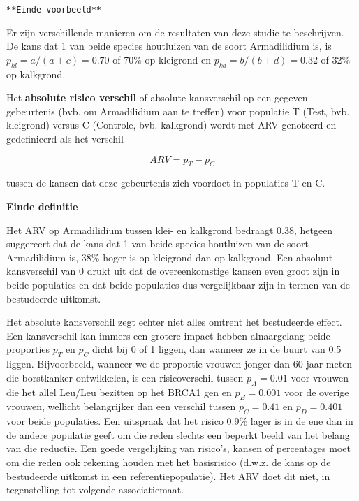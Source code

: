 \documentclass[12pt,dutch,coursenotes]{book}
\theoremstyle{definition}
\theoremstyle{definition}
\theoremstyle{definition}
\theoremstyle{remark}
\let\BeginKnitrBlock\begin \let\EndKnitrBlock\end
\begin{document}
\texttt{**Einde\ voorbeeld**}

Er zijn verschillende manieren om de resultaten van deze studie te
beschrijven. De kans dat 1 van beide species houtluizen van de soort
Armadilidium is, is \(p_{kl}=a/(a+c)=0.70\) of 70\% op kleigrond en
\(p_{ka}=b/(b+d)=0.32\) of 32\% op kalkgrond.

\BeginKnitrBlock{definition}[absolute risico verschil]
\protect\hypertarget{def:unnamed-chunk-56}{}{\label{def:unnamed-chunk-56}
\iffalse (absolute risico verschil) \fi{} }Het \textbf{absolute risico
verschil} of absolute kansverschil op een gegeven gebeurtenis (bvb. om
Armadilidium aan te treffen) voor populatie T (Test, bvb. kleigrond)
versus C (Controle, bvb. kalkgrond) wordt met ARV genoteerd en
gedefinieerd als het verschil

\begin{equation*}
ARV=p_T-p_C
\end{equation*}

tussen de kansen dat deze gebeurtenis zich voordoet in populaties T en
C.

\textbf{Einde definitie}
\EndKnitrBlock{definition}

Het ARV op Armadilidium tussen klei- en kalkgrond bedraagt 0.38, hetgeen
suggereert dat de kans dat 1 van beide species houtluizen van de soort
Armadilidium is, 38\% hoger is op kleigrond dan op kalkgrond. Een
absoluut kansverschil van 0 drukt uit dat de overeenkomstige kansen even
groot zijn in beide populaties en dat beide populaties dus vergelijkbaar
zijn in termen van de bestudeerde uitkomst.

Het absolute kansverschil zegt echter niet alles omtrent het bestudeerde
effect. Een kansverschil kan immers een grotere impact hebben
alnaargelang beide proporties \(p_T\) en \(p_C\) dicht bij 0 of 1
liggen, dan wanneer ze in de buurt van 0.5 liggen. Bijvoorbeeld, wanneer
we de proportie vrouwen jonger dan 60 jaar meten die borstkanker
ontwikkelen, is een risicoverschil tussen \(p_A=0.01\) voor vrouwen die
het allel Leu/Leu bezitten op het BRCA1 gen en \(p_B=0.001\) voor de
overige vrouwen, wellicht belangrijker dan een verschil tussen
\(p_C=0.41\) en \(p_D=0.401\) voor beide populaties. Een uitspraak dat
het risico 0.9\% lager is in de ene dan in de andere populatie geeft om
die reden slechts een beperkt beeld van het belang van die reductie. Een
goede vergelijking van risico's, kansen of percentages moet om die reden
ook rekening houden met het basisrisico (d.w.z. de kans op de
bestudeerde uitkomst in een referentiepopulatie). Het ARV doet dit niet,
in tegenstelling tot volgende associatiemaat.
\end{document}

